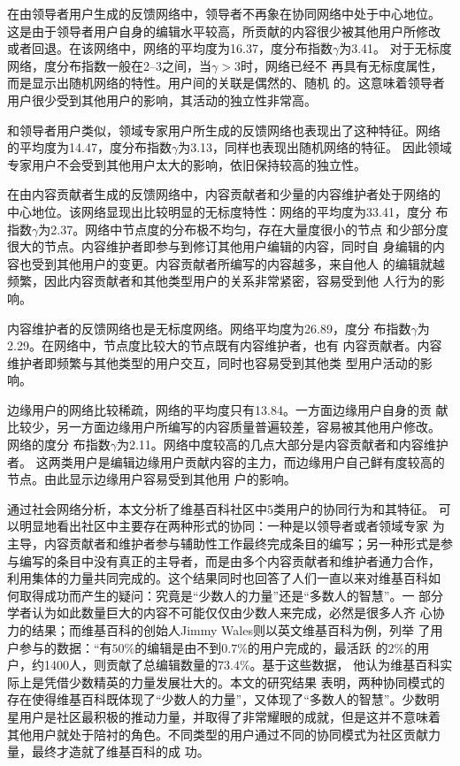 在由领导者用户生成的反馈网络中，领导者不再象在协同网络中处于中心地位。
这是由于领导者用户自身的编辑水平较高，所贡献的内容很少被其他用户所修改
或者回退。在该网络中，网络的平均度为16.37，度分布指数$\gamma$为3.41。
对于无标度网络，度分布指数一般在2--3之间，当$\gamma >3$时，网络已经不
再具有无标度属性，而是显示出随机网络的特性。用户间的关联是偶然的、随机
的。这意味着领导者用户很少受到其他用户的影响，其活动的独立性非常高。

和领导者用户类似，领域专家用户所生成的反馈网络也表现出了这种特征。网络
的平均度为14.47，度分布指数$\gamma$为3.13，同样也表现出随机网络的特征。
因此领域专家用户不会受到其他用户太大的影响，依旧保持较高的独立性。

在由内容贡献者生成的反馈网络中，内容贡献者和少量的内容维护者处于网络的
中心地位。该网络显现出比较明显的无标度特性：网络的平均度为33.41，度分
布指数$\gamma$为2.37。网络中节点度的分布极不均匀，存在大量度很小的节点
和少部分度很大的节点。内容维护者即参与到修订其他用户编辑的内容，同时自
身编辑的内容也受到其他用户的变更。内容贡献者所编写的内容越多，来自他人
的编辑就越频繁，因此内容贡献者和其他类型用户的关系非常紧密，容易受到他
人行为的影响。

内容维护者的反馈网络也是无标度网络。网络平均度为26.89，度分
布指数$\gamma$为2.29。在网络中，节点度比较大的节点既有内容维护者，也有
内容贡献者。内容维护者即频繁与其他类型的用户交互，同时也容易受到其他类
型用户活动的影响。

边缘用户的网络比较稀疏，网络的平均度只有13.84。一方面边缘用户自身的贡
献比较少，另一方面边缘用户所编写的内容质量普遍较差，容易被其他用户修改。
网络的度分
布指数$\gamma$为2.11。网络中度较高的几点大部分是内容贡献者和内容维护者。
这两类用户是编辑边缘用户贡献内容的主力，而边缘用户自己鲜有度较高的节点。由此显示边缘用户容易受到其他用
户的影响。

通过社会网络分析，本文分析了维基百科社区中5类用户的协同行为和其特征。
可以明显地看出社区中主要存在两种形式的协同：一种是以领导者或者领域专家
为主导，内容贡献者和维护者参与辅助性工作最终完成条目的编写；另一种形式是参
与编写的条目中没有真正的主导者，而是由多个内容贡献者和维护者通力合作，
利用集体的力量共同完成的。这个结果同时也回答了人们一直以来对维基百科如
何取得成功而产生的疑问：究竟是“少数人的力量”还是“多数人的智慧”。一
部分学者认为如此数量巨大的内容不可能仅仅由少数人来完成，必然是很多人齐
心协力的结果；而维基百科的创始人Jimmy Wales则以英文维基百科为例，列举
了用户参与的数据：“有$50\%$的编辑是由不到$0.7\%$的用户完成的，最活跃
的$2\%$的用户，约1400人，则贡献了总编辑数量的$73.4\%$。基于这些数据，
他认为维基百科实际上是凭借少数精英的力量发展壮大的。本文的研究结果
表明，两种协同模式的
存在使得维基百科既体现了“少数人的力量”，又体现了“多数人的智慧”。少数明
星用户是社区最积极的推动力量，并取得了非常耀眼的成就，但是这并不意味着
其他用户就处于陪衬的角色。不同类型的用户通过不同的协同模式为社区贡献力量，最终才造就了维基百科的成
功。

